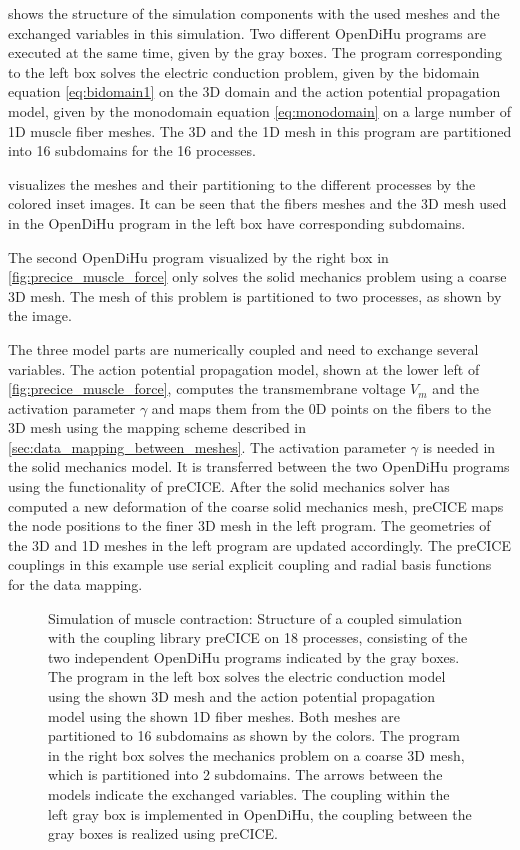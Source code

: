  shows the structure of the simulation components with the used meshes and the exchanged variables in this simulation. Two different OpenDiHu programs are executed at the same time, given by the gray boxes. The program corresponding to the left box solves the electric conduction problem, given by the bidomain equation \cref{eq:bidomain1} on the 3D domain and the action potential propagation model, given by the monodomain equation \cref{eq:monodomain} on a large number of 1D muscle fiber meshes. 
The 3D and the 1D mesh in this program are partitioned into 16 subdomains for the 16 processes.

 visualizes the meshes and their partitioning to the different processes by the colored inset images. It can be seen that the fibers meshes and the 3D mesh used in the OpenDiHu program in the left box have corresponding subdomains.

The second OpenDiHu program visualized by the right box in \cref{fig:precice_muscle_force} only solves the solid mechanics problem using a coarse 3D mesh. The mesh of this problem is partitioned to two processes, as shown by the image. 

The three model parts are numerically coupled and need to exchange several variables. The action potential propagation model, shown at the lower left of \cref{fig:precice_muscle_force}, computes the transmembrane voltage $V_m$ and the activation parameter $\gamma$ and maps them from the 0D points on the fibers to the 3D mesh using the mapping scheme described in \cref{sec:data_mapping_between_meshes}. The activation parameter $\gamma$ is needed in the solid mechanics model. It is transferred between the two OpenDiHu programs using the functionality of preCICE. After the solid mechanics solver has computed a new deformation of the coarse solid mechanics mesh, preCICE maps the node positions to the finer 3D mesh in the left program. The geometries of the 3D and 1D meshes in the left program are updated accordingly.
The preCICE couplings in this example use serial explicit coupling and radial basis functions for the data mapping.

\begin{figure}
  \centering%
  \def\svgwidth{0.9\textwidth}
  \caption{Simulation of muscle contraction: Structure of a coupled simulation with the coupling library preCICE on 18 processes, consisting of the two independent OpenDiHu programs indicated by the gray boxes. The program in the left box solves the electric conduction model using the shown 3D mesh and the action potential propagation model using the shown 1D fiber meshes. Both meshes are partitioned to 16 subdomains as shown by the colors. The program in the right box solves the mechanics problem on a coarse 3D mesh, which is partitioned into 2 subdomains. The arrows between the models indicate the exchanged variables. The coupling within the left gray box is implemented in OpenDiHu, the coupling between the gray boxes is realized using preCICE.}%
  \label{fig:precice_scheme1}%
\end{figure}

